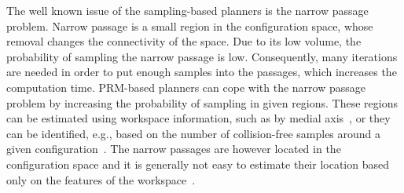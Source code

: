 \documentclass[usletter, 10pt, conference]{ieeeconf} %
\def\C{\mathcal{C}}
\begin{document}
The well known issue of the sampling-based planners is the narrow passage problem.
Narrow passage is a small region in the configuration space, whose removal changes the connectivity of the space.
Due to its low volume, the probability of sampling the narrow passage is low.
Consequently, many iterations are needed in order to put enough samples into the passages, which increases the computation time.
PRM-based planners can cope with the narrow passage problem by increasing the probability of sampling in given regions.
These regions can be estimated using workspace information, such as by medial axis~\cite{amatoOBRRT,amato2002using,wilmarthMAPRM}, 
or they can be identified, e.g., based on the number of collision-free samples around a given configuration~\cite{overmarsGauss,hsuBridge}.
The narrow passages are however located in the configuration space and it is generally not easy to estimate their location
based only on the features of the workspace~\cite{hannaWIS}.

\end{document}
